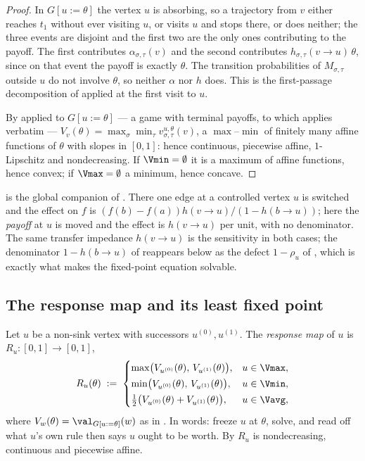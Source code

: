 \begin{proof}
In $G[u{:=}\theta]$ the vertex $u$ is absorbing, so a trajectory from $v$
either reaches $t_1$ without ever visiting $u$, or visits $u$ and stops
there, or does neither; the three events are disjoint and the first two
are the only ones contributing to the payoff. The first contributes
$\alpha_{\sigma,\tau}(v)$ and the second contributes
$h_{\sigma,\tau}(v\to u)\,\theta$, since on that event the payoff is
exactly $\theta$. The transition probabilities of $M_{\sigma,\tau}$
outside $u$ do not involve $\theta$, so neither $\alpha$ nor $h$ does.
This is the first-passage decomposition of  applied
at the first visit to $u$.

By  applied to $G[u{:=}\theta]$ --- a game with
terminal payoffs, to which  applies verbatim ---
$V_v(\theta)=\max_\sigma\min_\tau v^{u,\theta}_{\sigma,\tau}(v)$, a
$\max$--$\min$ of finitely many affine functions of $\theta$ with slopes
in $[0,1]$: hence continuous, piecewise affine, $1$-Lipschitz and
nondecreasing. If $\Vmin=\emptyset$ it is a maximum of affine functions,
hence convex; if $\Vmax=\emptyset$ a minimum, hence concave.
\end{proof}

\begin{remark}\label{rem:bv-impedance}
 is the global companion of . There
one edge at a controlled vertex $u$ is switched and the effect on $f$ is
$(f(b)-f(a))h(v\to u)/(1-h(b\to u))$; here the \emph{payoff} at $u$ is
moved and the effect is $h(v\to u)$ per unit, with no denominator. The
same transfer impedance $h(v\to u)$ is the sensitivity in both cases; the
denominator $1-h(b\to u)$ of  reappears below as the
defect $1-\rho_u$ of , which is exactly what makes
the fixed-point equation solvable.
\end{remark}

\subsection{The response map and its least fixed point}

\begin{definition}\label{def:bv-response}
Let $u$ be a non-sink vertex with successors $u^{(0)},u^{(1)}$. The
\emph{response map} of $u$ is $R_u\colon[0,1]\to[0,1]$,
\[
  R_u(\theta)\;:=\;
  \begin{cases}
    \max\bigl(V_{u^{(0)}}(\theta),\,V_{u^{(1)}}(\theta)\bigr), & u\in\Vmax,\\[2pt]
    \min\bigl(V_{u^{(0)}}(\theta),\,V_{u^{(1)}}(\theta)\bigr), & u\in\Vmin,\\[2pt]
    \tfrac12\bigl(V_{u^{(0)}}(\theta)+V_{u^{(1)}}(\theta)\bigr), & u\in\Vavg,
  \end{cases}
\]
where $V_w(\theta)=\val_{G[u:=\theta]}(w)$ as in .
In words: freeze $u$ at $\theta$, solve, and read off what $u$'s own rule
then says $u$ ought to be worth. By  $R_u$ is
nondecreasing, continuous and piecewise affine.
\end{definition}

